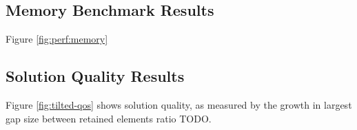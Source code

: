 

\subsection{Memory Benchmark Results}


Figure \ref{fig:perf:memory}

\subsection{Solution Quality Results}



Figure \ref{fig:tilted-qos} shows solution quality, as measured by the growth in largest gap size between retained elements ratio TODO.
